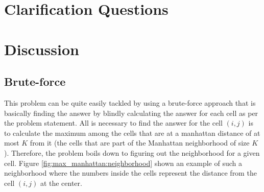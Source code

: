 \section{Clarification Questions}

\begin{QandA}
	\item 
	\begin{answered}
		\textit{}
	\end{answered}
	
\end{QandA}

\section{Discussion}
\label{max_manhattan:sec:discussion}

\subsection{Brute-force}
\label{max_manhattan:sec:bruteforce}
This problem can be quite easily tackled by using a brute-force approach that is basically finding the answer 
by blindly calculating the answer for each cell as per the problem statement. 
All is necessary to find the answer for the cell $(i,j)$ is to calculate the maximum among the cells that are 
at a manhattan distance of at most $K$ from it (the cells that are part of the Manhattan neighborhood of size $K$).
Therefore, the problem boils down to figuring out  the neighborhood for a given cell.
Figure \ref{fig:max_manhattan:neighborhood} shown an example of such a neighborhood where the numbers inside the
cells represent the distance from the cell $(i,j)$ at the center. 
